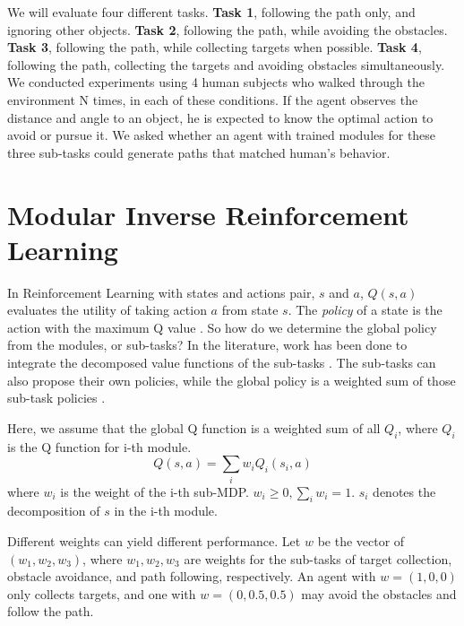\documentclass[11pt]{article} %
\begin{document}
We will evaluate four different tasks. {\bf Task 1}, following the path only, and
ignoring other objects. {\bf Task 2}, following the path, while avoiding the obstacles.
{\bf Task 3}, following the path, while collecting targets when possible. {\bf Task 4},
following the path, collecting the targets and avoiding obstacles
simultaneously.
We conducted experiments using 4 human subjects who walked through the environment N times, in each of these conditions. 
If the agent observes the distance and angle to an object, he is expected to
know the optimal action to avoid or pursue it. We asked whether an agent with trained modules for these three
sub-tasks could generate paths that matched human's behavior.

\section{Modular Inverse Reinforcement Learning}
\label{sec:rl}

In Reinforcement Learning with states and actions
pair, $s$ and $a$, $Q(s, a)$ evaluates the utility of taking action $a$ from
state $s$. The {\em policy} of a state is the action with the maximum Q
value \cite{rl}. So how do we determine the global policy from the modules, or
sub-tasks? In the literature, work has been done to integrate the decomposed
value functions of the sub-tasks \cite{koller1999computing}. The sub-tasks can
also propose their own policies, while the global policy is a weighted sum of
those sub-task policies \cite{thomas2012motor}.

Here, we assume that the global Q function is a weighted sum of all $Q_i$, where
$Q_i$ is the Q function for i-th module.
$$Q(s, a) = \sum_i w_i Q_i (s_i, a)$$
where $w_i$ is the weight of the i-th sub-MDP. $w_i \geq 0, \sum_i w_i = 1$.
$s_i$ denotes the decomposition of $s$ in the i-th module.

Different weights can yield different performance. Let $w$ be the vector of
$(w_1, w_2, w_3)$, where $w_1, w_2, w_3$ are weights for the sub-tasks of target
collection, obstacle avoidance, and path following, respectively. An agent with
$w = (1, 0, 0)$ only collects targets, and one with $w = (0, 0.5, 0.5)$ may
avoid the obstacles and follow the path.
\end{document}
